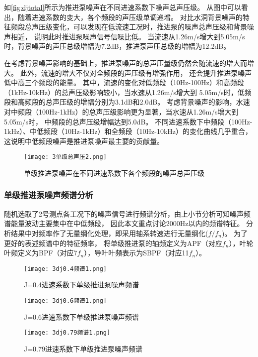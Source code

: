 如\autoref{fig:djtotal}所示为推进泵噪声在不同进速系数下噪声总声压级。
从图中可以看出，随着进速系数的变大，各个频段的声压级单调递增。
对比水洞背景噪声的特征频段总声压级变化，可以发现在低流速工况时，推进泵的噪声总声压级和背景噪声相近，
说明此时推进泵噪声信号信噪比低。
当流速从1.26m/s增大到5.05m/s时，背景噪声的声压总级增幅为7.2dB，推进泵声压总级的增幅为12.2dB。

在考虑背景噪声影响的基础上，推进泵噪声的总声压量级仍然会随流速的增大而增大。
此外，流速的增大不仅对全频段的声压级有增强作用，
还会提升推进泵噪声低中高三个频段的能量。
其中，流速的变化对低频段（10Hz-100Hz）和高频段（1kHz-10kHz）的总声压级影响较小，当水速从1.26m/s增大到
5.05m/s时，低频段和高频段的总声压级的增幅分别为3.1dB和2.0dB。
考虑背景噪声的影响，水速对中频段（100Hz-1kHz）的总声压级影响更为显著，当水速从1.26m/s增大到5.05m/s时，
中频段的总声压级增幅达到5.0dB。
不同进速系数下中频段（100Hz-1kHz）、中低频段（10Hz-1kHz）和全频段（10Hz-10kHz）的变化曲线几乎重合，
这说明中低频段噪声是推进泵噪声最主要的贡献量。
\begin{figure}[htbp]
    \centering
    \texttt{[image: 3单级总声压2.png]}
    \caption{\label{fig:djtotal}单级推进泵噪声在不同进速系数下各个频段的噪声总声压级}
\end{figure}
\subsubsection{单级推进泵噪声频谱分析}
随机选取了2号测点各工况下的噪声信号进行频谱分析，由上小节分析可知噪声频谱能量波动主要集中在中低频段，
因此本文重点讨论2000Hz以内的频谱特征。
分析结果中对频率作了无量纲化处理，即采用轴系转速进行无量纲化($f/f_n$)。
为了更好的表述频谱中的特征频率，
将单级推进泵的轴频定义为APF（对应$f_n$），叶轮叶频定义为BPF（对应7$f_n$），导叶叶频表示为SBPF（对应11$f_n$）。
\begin{figure}[htbp]
    \centering
    \texttt{[image: 3dj0.4频谱1.png]}
    \caption{\label{fig:dj0.4}J=0.4进速系数下单级推进泵噪声频谱}
\end{figure}
\begin{figure}[htbp]
    \centering
    \texttt{[image: 3dj0.6频谱1.png]}
    \caption{\label{fig:dj0.6}J=0.6进速系数下单级推进泵噪声频谱}
\end{figure}
\begin{figure}[htbp]
    \centering
    \texttt{[image: 3dj0.79频谱1.png]}
    \caption{\label{fig:dj0.79}J=0.79进速系数下单级推进泵噪声频谱}
\end{figure}

